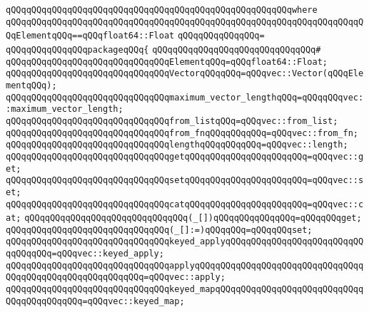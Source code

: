 \verb|qQQqqQQqqQQqqQQqqQQqqQQqqQQqqQQqqQQqqQQqqQQqqQQqqQQqqQQqwhere|\newline
\verb|qQQqqQQqqQQqqQQqqQQqqQQqqQQqqQQqqQQqqQQqqQQqqQQqqQQqqQQqqQQqqQQqqQQqqQQqElementqQQq==qQQqfloat64::Float|\newline
\verb|qQQqqQQqqQQqqQQq=|\newline
\verb|qQQqqQQqqQQqqQQqpackageqQQq{|\newline
\verb|qQQqqQQqqQQqqQQqqQQqqQQqqQQqqQQq#|\newline
\verb|qQQqqQQqqQQqqQQqqQQqqQQqqQQqqQQqElementqQQq=qQQqfloat64::Float;|\newline
\verb|qQQqqQQqqQQqqQQqqQQqqQQqqQQqqQQqVectorqQQqqQQq=qQQqvec::Vector(qQQqElementqQQq);|\newline
\newline
\verb|qQQqqQQqqQQqqQQqqQQqqQQqqQQqqQQqmaximum_vector_lengthqQQq=qQQqqQQqvec::maximum_vector_length;|\newline
\newline
\verb|qQQqqQQqqQQqqQQqqQQqqQQqqQQqqQQqfrom_listqQQq=qQQqvec::from_list;|\newline
\verb|qQQqqQQqqQQqqQQqqQQqqQQqqQQqqQQqfrom_fnqQQqqQQqqQQq=qQQqvec::from_fn;|\newline
\newline
\verb|qQQqqQQqqQQqqQQqqQQqqQQqqQQqqQQqlengthqQQqqQQqqQQq=qQQqvec::length;|\newline
\verb|qQQqqQQqqQQqqQQqqQQqqQQqqQQqqQQqgetqQQqqQQqqQQqqQQqqQQqqQQq=qQQqvec::get;|\newline
\verb|qQQqqQQqqQQqqQQqqQQqqQQqqQQqqQQqsetqQQqqQQqqQQqqQQqqQQqqQQq=qQQqvec::set;|\newline
\verb|qQQqqQQqqQQqqQQqqQQqqQQqqQQqqQQqcatqQQqqQQqqQQqqQQqqQQqqQQq=qQQqvec::cat;|\newline
\newline
\verb|qQQqqQQqqQQqqQQqqQQqqQQqqQQqqQQq(_[])qQQqqQQqqQQqqQQq=qQQqqQQqget;|\newline
\verb|qQQqqQQqqQQqqQQqqQQqqQQqqQQqqQQq(_[]:=)qQQqqQQq=qQQqqQQqset;|\newline
\newline
\verb|qQQqqQQqqQQqqQQqqQQqqQQqqQQqqQQqkeyed_applyqQQqqQQqqQQqqQQqqQQqqQQqqQQqqQQqqQQq=qQQqvec::keyed_apply;|\newline
\verb|qQQqqQQqqQQqqQQqqQQqqQQqqQQqqQQqapplyqQQqqQQqqQQqqQQqqQQqqQQqqQQqqQQqqQQqqQQqqQQqqQQqqQQqqQQqqQQq=qQQqvec::apply;|\newline
\newline
\verb|qQQqqQQqqQQqqQQqqQQqqQQqqQQqqQQqkeyed_mapqQQqqQQqqQQqqQQqqQQqqQQqqQQqqQQqqQQqqQQqqQQq=qQQqvec::keyed_map;|\newline
